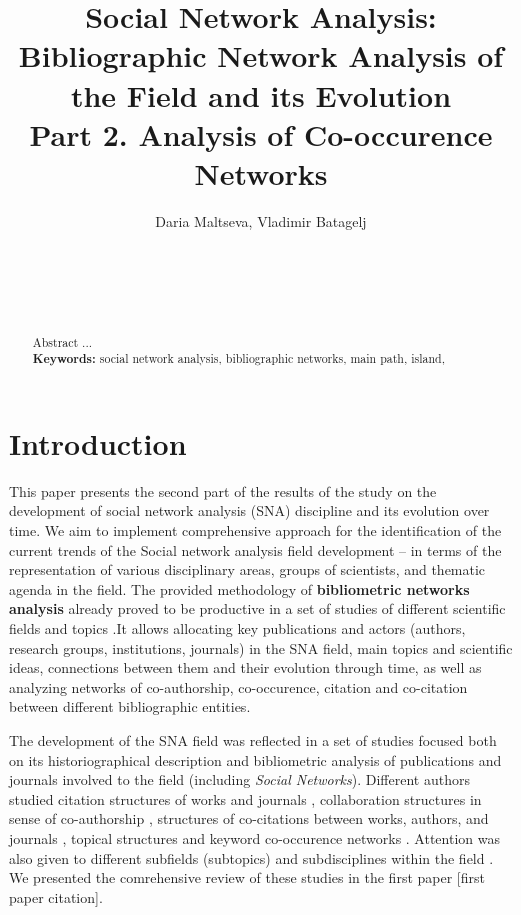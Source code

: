 \documentclass[11pt]{article} %
\title{\LARGE\textbf{Social Network Analysis:}\protect\\ Bibliographic Network Analysis of the Field and its Evolution\\ Part 2. Analysis of Co-occurence Networks}
\author{%
Daria Maltseva\affmark[1], Vladimir Batagelj\affmark[1,2,3]\\
\affaddr{\affmark[1]NRU HSE Moscow}\\
\affaddr{\affmark[2]IMFM Ljubljana}\\
\affaddr{\affmark[3]IAM UP Koper}\\ \email{d\_malceva@mail.ru}\\
\email{vladimir.batagelj@fmf.uni-lj.si} %
}
\begin{document}

\maketitle

\begin{abstract}
Abstract ...
\\[4pt]
\textbf{Keywords:}  social network analysis, bibliographic networks, main path,  island,
\end{abstract}



\section{Introduction}

This paper presents the second part of the results of the study on the development of social network analysis (SNA) discipline and its evolution over time. We aim to implement comprehensive approach for the identification of the current trends of the Social network analysis field development -- in terms of the representation of various disciplinary areas, groups of scientists, and thematic agenda in the field. The provided methodology of \textbf{bibliometric networks analysis} already proved to be productive in a set of studies of different scientific fields and topics \citep{kejzar,Understand,PeerRew}.It allows allocating key publications and actors (authors, research groups, institutions, journals) in the SNA field, main topics and scientific ideas, connections between them and their evolution through time, as well as analyzing networks of co-authorship, co-occurence, citation and co-citation between different bibliographic entities. \medskip 

The development of the SNA field was reflected in a set of studies focused both on its historiographical description \citep{SNAdev} and bibliometric analysis of publications and journals involved to the field (including \textit {Social Networks}). Different authors studied citation structures of works and journals \citep{normSci,leydes,Understand}, collaboration structures in sense of co-authorship \citep{SNAinf, leydes,Understand}, structures of co-citations between works, authors, and journals \citep{brandes}, topical structures and keyword co-occurence networks \citep{leydes,lookingglass}. Attention was also given to different subfields (subtopics)  \citep{central,kejzar,Understand,batagelj2019} and subdisciplines within the field \citep{SNAinf,borgatti,lazer,varga}. We presented the comrehensive review of these studies in the first paper [first paper citation]. 
\end{document}
